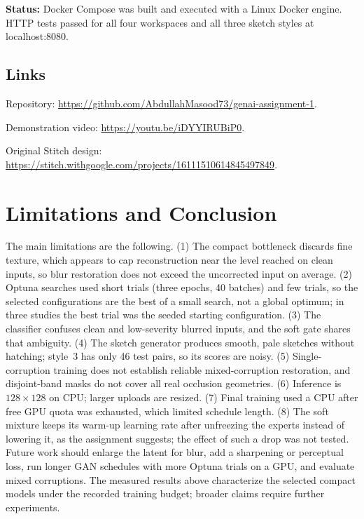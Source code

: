\documentclass[conference]{IEEEtran}
\newcommand{\statusnote}[1]{\par\smallskip\noindent\textbf{Status:} #1\par\smallskip}
\begin{document}
\statusnote{Docker Compose was built and executed with a Linux Docker engine. HTTP tests passed for all four workspaces and all three sketch styles at localhost:8080.}
\subsection{Links}

Repository: \url{https://github.com/AbdullahMasood73/genai-assignment-1}.\par

Demonstration video: \url{https://youtu.be/iDYYIRUBiP0}.\par

Original Stitch design: \url{https://stitch.withgoogle.com/projects/16111510614845497849}.\par


\section{Limitations and Conclusion}
The main limitations are the following. (1) The compact bottleneck discards
fine texture, which appears to cap reconstruction near the level reached on clean inputs,
so blur restoration does not exceed the uncorrected input on average.
(2) Optuna searches used short trials (three epochs, 40 batches) and few trials,
so the selected configurations are the best of a small search, not a global
optimum; in three studies the best trial was the seeded starting configuration.
(3) The classifier confuses clean and low-severity blurred inputs, and the soft
gate shares that ambiguity. (4) The sketch generator produces smooth, pale
sketches without hatching; style~3 has only 46 test pairs, so its scores are
noisy. (5) Single-corruption training does not establish reliable
mixed-corruption restoration, and disjoint-band masks do not cover all real
occlusion geometries. (6) Inference is $128\times128$ on CPU; larger uploads are
resized. (7) Final training used a CPU after free GPU quota was exhausted, which
limited schedule length. (8) The soft mixture keeps its warm-up learning rate
after unfreezing the experts instead of lowering it, as the assignment suggests;
the effect of such a drop was not tested.
Future work should enlarge the latent for blur, add a sharpening or perceptual
loss, run longer GAN schedules with more Optuna trials on a GPU, and evaluate
mixed corruptions.
The measured results above characterize the selected compact models under the recorded training budget; broader claims require further experiments.
\end{document}
